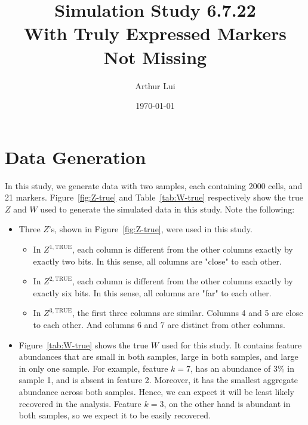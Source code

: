 \documentclass[10pt]{article} %
\title{Simulation Study 6.7.22 \\ 
With Truly Expressed Markers Not Missing}
\author{Arthur Lui}
\date{\today} %
\def\true{\text{TRUE}}
\begin{document}
\maketitle



\section{Data Generation}\label{sec:data-generation}
In this study, we generate data with two samples, each containing 2000 cells,
and 21 markers. Figure~\ref{fig:Z-true} and Table~\ref{tab:W-true}
respectively show the true $Z$ and $W$ used to generate the simulated data in
this study. Note the following:
\begin{itemize}
  \item Three $Z$'s, shown in Figure~\ref{fig:Z-true}, were used in this study.
  \begin{itemize}
    \item In $Z^{1,\true}$, each column is different from the other columns exactly
    by exactly two bits. In this sense, all columns are "close" to each
    other.
    \item In $Z^{2,\true}$, each column is different from the other columns exactly
    by exactly six bits. In this sense, all columns are "far" to each
    other.
    \item In $Z^{3,\true}$, the first three columns are similar. Columns 4 and 5 are 
    close to each other. And columns 6 and 7 are distinct from other columns. 
  \end{itemize}
  \item Figure~\ref{tab:W-true} shows the true $W$ used for this study. It
    contains feature abundances that are small in both samples, large in both
    samples, and large in only one sample. For example, feature $k=7$, 
    has an abundance of $3\%$ in sample 1, and is absent in feature 2. 
    Moreover, it has the smallest aggregate abundance across both samples. 
    Hence, we can expect it will be least likely recovered in the analysis. 
    Feature $k=3$, on the other hand is abundant in both samples, so we expect
    it to be easily recovered.
\end{itemize}
\end{document}
